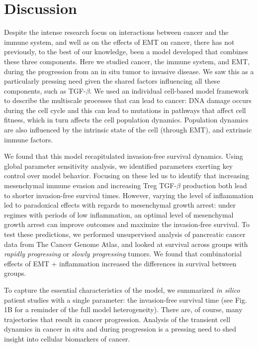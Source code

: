 \documentclass[11pt]{article}
\begin{document}

\section{Discussion}\label{Discussion}
Despite the intense research focus on interactions between cancer and the immune system, and well as on the effects of EMT on cancer, there has not previously, to the best of our knowledge, been a model developed that combines these three components. Here we studied cancer, the immune system, and EMT, during the progression from an in situ tumor to invasive disease. We saw this as a particularly pressing need given the shared factors influencing all these components, such as TGF-$\beta$. We used an individual cell-based model framework to describe the multiscale processes that can lead to cancer: DNA damage occurs during the cell cycle and this can lead to mutations in pathways that affect cell fitness, which in turn affects the cell population dynamics. Population dynamics are also influenced by the intrinsic state of the cell (through EMT), and extrinsic immune factors.
\par
We found that this model recapitulated invasion-free survival dynamics. Using global parameter sensitivity analysis, we identified parameters exerting key control over model behavior. Focusing on these led us to identify that increasing mesenchymal immune evasion and increasing Treg TGF-$\beta$ production both lead to shorter invasion-free survival times. However, varying the level of inflammation led to paradoxical effects with regards to mesenchymal growth arrest: under regimes with periods of low inflammation, an optimal level of mesenchymal growth arrest can improve outcomes and maximize the invasion-free survival. To test these predictions, we performed unsupervised analysis of pancreatic cancer data from The Cancer Genome Atlas, and looked at survival across groups with {\em rapidly progressing} or {\em slowly progressing}  tumors. We found that combinatorial effects of EMT + inflammation increased the differences in survival between groups.
\par
To capture the essential characteristics of the model, we summarized {\em in silico} patient studies with a single parameter: the invasion-free survival time (see Fig. 1B for a reminder of the full model heterogeneity). There are, of course, many trajectories that result in cancer progression. Analysis of the transient cell dynamics in cancer in situ and during progression is a pressing need to shed insight into cellular biomarkers of cancer.
\end{document}
